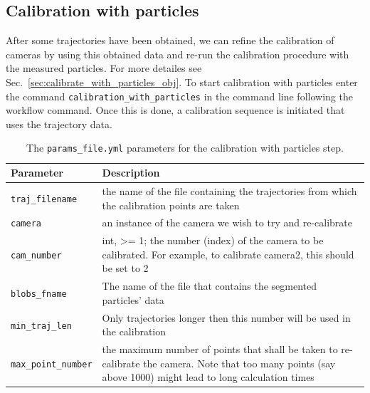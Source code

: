 \documentclass[10pt,a4paper]{article}
\begin{document}
\subsection{Calibration with particles}\label{sec:workflow_calibration_with_particles}

After some trajectories have been obtained, we can refine the calibration of cameras by using this obtained data and re-run the calibration procedure with the measured particles. For more detailes see Sec.~\ref{sec:calibrate_with_particles_obj}. To start calibration with particles enter the command \texttt{calibration\_with\_particles} in the command line following the workflow command. Once this is done, a calibration sequence is initiated that uses the trajectory data.



\begin{table}[!ht]
	\centering
	\caption{The \texttt{params\_file.yml} parameters for the calibration with particles step.}
	\begin{tabular}{l m{13cm}}
		\hline
		Parameter & Description\\
		\hline
		
		\texttt{traj\_filename} & the name of the file containing the trajectories from
		which the calibration points are taken\\[.5em]
		
		\texttt{camera} & an instance of the camera we wish to try and re-calibrate\\[.5em]
		
		\texttt{cam\_number} & int, >= 1; the number (index) of the camera to be
		calibrated. For example, to calibrate camera2, this should be set to 2\\[.5em]
		
		\texttt{blobs\_fname} & The name of the file that contains the segmented 
		particles' data\\[.5em]
		
		\texttt{min\_traj\_len} & Only trajectories longer then this number will be used in the calibration\\[.5em]
		
		\texttt{max\_point\_number} & the maximum number of points that shall be taken to re-calibrate the camera. Note that too many points (say above 1000) might lead to long calculation times\\[.5em]
		
		\hline
	\end{tabular}
\end{table}
\end{document}
